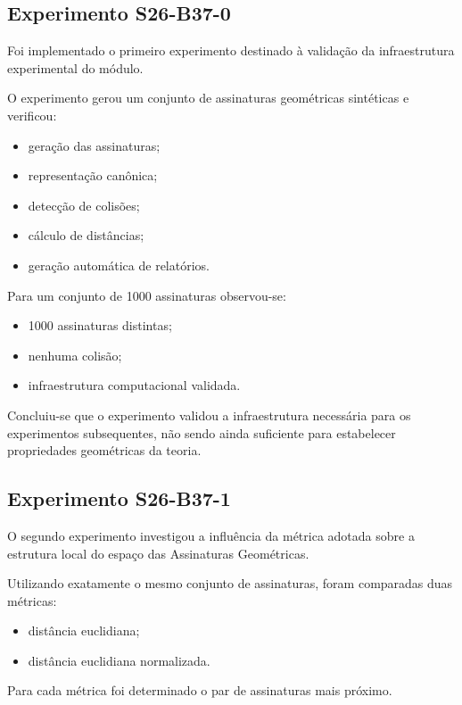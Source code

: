 \documentclass[11pt,a4paper]{article}
\begin{document}
\subsection{Experimento S26-B37-0}

Foi implementado o primeiro experimento destinado à validação da infraestrutura
experimental do módulo.

O experimento gerou um conjunto de assinaturas geométricas sintéticas e
verificou:

\begin{itemize}
\item geração das assinaturas;
\item representação canônica;
\item detecção de colisões;
\item cálculo de distâncias;
\item geração automática de relatórios.
\end{itemize}

Para um conjunto de 1000 assinaturas observou-se:

\begin{itemize}
\item 1000 assinaturas distintas;
\item nenhuma colisão;
\item infraestrutura computacional validada.
\end{itemize}

Concluiu-se que o experimento validou a infraestrutura necessária para os
experimentos subsequentes, não sendo ainda suficiente para estabelecer
propriedades geométricas da teoria.

\subsection{Experimento S26-B37-1}

O segundo experimento investigou a influência da métrica adotada sobre a
estrutura local do espaço das Assinaturas Geométricas.

Utilizando exatamente o mesmo conjunto de assinaturas, foram comparadas duas
métricas:

\begin{itemize}
\item distância euclidiana;
\item distância euclidiana normalizada.
\end{itemize}

Para cada métrica foi determinado o par de assinaturas mais próximo.
\end{document}
